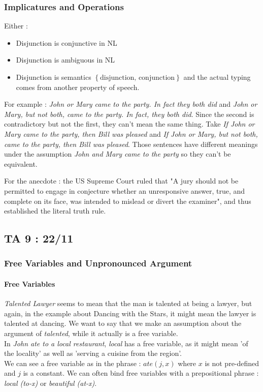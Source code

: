 \documentclass{cours}
\begin{document}
\subsubsection{Implicatures and Operations}
Either\! :
\begin{itemize}
    \item Disjunction is conjunctive in NL
    \item Disjunction is ambiguous in NL
    \item Disjunction is semantics $\left\{\text{disjunction, conjunction}\right\}$ and the actual typing comes from another property of speech.
\end{itemize}

For example\! : \textsl{John or Mary came to the party. In fact they both did} and \textsl{John or Mary, but not both, came to the party. In fact, they both did}. Since the second is contradictory but not the first, they can't mean the same thing.
Take \textsl{If John or Mary came to the party, then Bill was pleased} and \textsl{If John or Mary, but not both, came to the party, then Bill was pleased}. Those sentences have different meanings under the assumption \textsl{John and Mary came to the party} so they can't be equivalent.

For the anecdote\! : the US Supreme Court ruled that "A jury should not be permitted to engage in conjecture whether an unresponsive answer, true, and complete on its face, was intended to mislead or divert the examiner", and thus established the literal truth rule.

\subsection{TA 9\! : 22/11}
\subsubsection{Free Variables and Unpronounced Argument}
\paragraph{Free Variables}
\textsl{Talented Lawyer} seems to mean that the man is talented at being a lawyer, but again, in the example about Dancing with the Stars, it might mean the lawyer is talented at dancing. We want to say that we make an assumption about the argument of \textsl{talented}, while it actually is a free variable. \\
In \textsl{John ate to a local restaurant}, \textsl{local} has a free variable, as it might mean 'of the locality' as well as 'serving a cuisine from the region'.\\
We can see a free variable as in the phrase\! : $ate(j, x)$ where $x$ is not pre-defined and $j$ is a constant.
We can often bind free variables with a prepositional phrase\! : \textsl{local (to-x)} or \textsl{beautiful (at-x)}.
\end{document}

